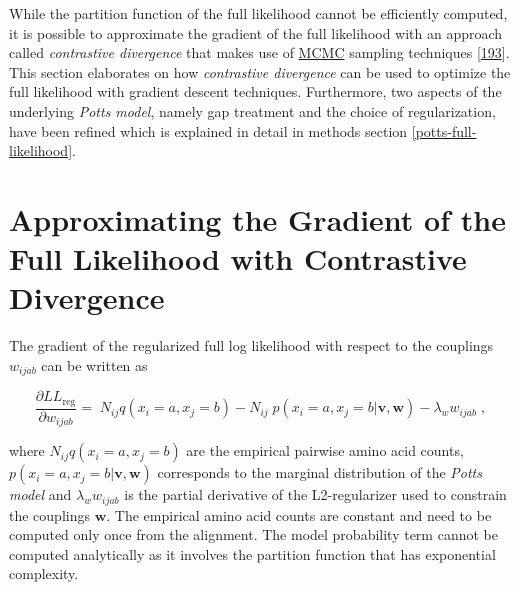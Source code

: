 \documentclass[11pt,a4paper,twoside]{book}
\newcommand{\eq}{\!=\!}
\newcommand{\LLreg}{L\!L_\mathrm{reg}}
\renewcommand{\v}{\mathbf{v}}
\newcommand{\w}{\mathbf{w}}
\newcommand{\wijab}{w_{ijab}}
\theoremstyle{definition}
\theoremstyle{definition}
\theoremstyle{remark}
\begin{document}
While the partition function of the full likelihood cannot be
efficiently computed, it is possible to approximate the gradient of the
full likelihood with an approach called \emph{contrastive divergence}
that makes use of \protect\hyperlink{abbrev}{MCMC} sampling techniques
{[}\protect\hyperlink{ref-Hinton2002}{193}{]}. This section elaborates
on how \emph{contrastive divergence} can be used to optimize the full
likelihood with gradient descent techniques. Furthermore, two aspects of
the underlying \emph{Potts model}, namely gap treatment and the choice
of regularization, have been refined which is explained in detail in
methods section \ref{potts-full-likelihood}.

\section{Approximating the Gradient of the Full Likelihood with
Contrastive Divergence}\label{full-likelihood-gradient}

The gradient of the regularized full log likelihood with respect to the
couplings \(\wijab\) can be written as

\begin{equation}
    \frac{\partial \LLreg}{\partial \wijab} = \; N_{ij} q(x_i \eq a, x_j=b) - N_{ij} \; p(x_i \eq a, x_j \eq b | \v,\w) - \lambda_w \wijab  \; ,
\label{eq:gradient-wijab-full-likelihood-approx}
\end{equation}

where \(N_{ij} q(x_i \eq a, x_j=b)\) are the empirical pairwise amino
acid counts, \(p(x_i \eq a, x_j \eq b | \v,\w)\) corresponds to the
marginal distribution of the \emph{Potts model} and \(\lambda_w \wijab\)
is the partial derivative of the L2-regularizer used to constrain the
couplings \(\w\). The empirical amino acid counts are constant and need
to be computed only once from the alignment. The model probability term
cannot be computed analytically as it involves the partition function
that has exponential complexity.
\end{document}
